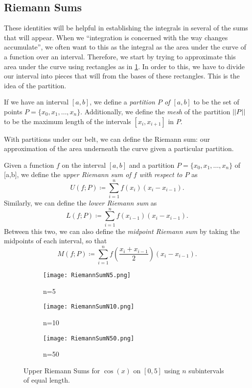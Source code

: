 \subsection{Riemann Sums}

These identities will be helpful in establishing the integrals in several of the sums that will appear. When we ``integration is concerned with the way changes accumulate'', we often want to this as the integral as the area under the curve of a function over an interval. Therefore, we start by trying to approximate this area under the curve using rectangles as in \cref{fig:RiemannSumIncresN}. In order to this, we have to divide our interval into pieces that will from the bases of these rectangles. This is the idea of the partition.
\begin{defn}[Partition]
If we have an interval $[a,b]$, we define a \emph{partition $P$ of $[a,b]$} to be the set of points $P=\{x_0,x_1,\dotsc, x_n\}$. Additionally, we define the \emph{mesh} of the partition $\left| \left| P \right| \right|$ to be the maximum length of the intervals $[x_i,x_{i+1}]$ in $P$.
\end{defn}

With partitions under our belt, we can define the Riemann sum: our approximation of the area underneath the curve given a particular partition.

\begin{defn}
  Given a function $f$ on the interval $[a,b]$ and a partition $P=\{x_0,x_1,\dotsc, x_n\}$ of [a,b], we define the \emph{upper Riemann sum of $f$ with respect to $P$} as
\begin{equation}
  U(f;P)\coloneqq\sum_{i=1}^{n}f(x_i)(x_i-x_{i-1}).
\end{equation}
Similarly, we can define the \emph{lower Riemann sum} as
\begin{equation}
  L(f;P)\coloneqq\sum_{i=1}^{n}f(x_{i-1})(x_i-x_{i-1}).
\end{equation}
Between this two, we can also define the \emph{ midpoint Riemann sum} by taking the midpoints of each interval, so that
\begin{equation}
  M(f;P)\coloneqq\sum_{i=1}^{n}f\left(\frac{x_{i}+x_{i-1}}{2}\right)(x_i-x_{i-1}).
\end{equation}
\end{defn}

\begin{figure}
\centering
\begin{subfigure}{.33\textwidth}
  \texttt{[image: RiemannSumN5.png]}
  \caption{n=5}
\end{subfigure}%
\begin{subfigure}{.33\textwidth}
  \texttt{[image: RiemannSumN10.png]}
  \caption{n=10}
\end{subfigure}
\begin{subfigure}{.33\textwidth}
  \texttt{[image: RiemannSumN50.png]}
  \caption{n=50}
\end{subfigure}
\caption{Upper Riemann Sums for $\cos(x)$ on $[0,5]$ using $n$ subintervals of equal length.}
\label{fig:RiemannSumIncresN}
\end{figure}


